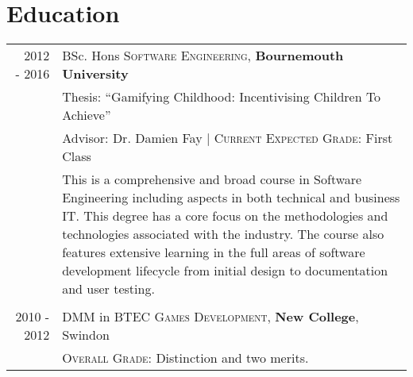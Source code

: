 \section{Education}
\begin{tabular}{r|p{11cm}}
	\ 2012 - 2016 & BSc. Hons \textsc{Software Engineering}, \textbf{Bournemouth University}\\ 
	\ & Thesis: ``Gamifying Childhood: Incentivising Children To Achieve'' \\
	\ & Advisor: Dr. Damien Fay | \normalsize \textsc{Current Expected Grade}: First Class \\
	\ & \footnotesize{This is a comprehensive and broad course in Software Engineering including aspects in both technical and business IT. This degree has a core focus on the methodologies and technologies associated with the industry. The course also features extensive learning in the full areas of software development lifecycle from initial design to documentation and user testing.} \\

	\multicolumn{2}{c}{} \\


	2010 - 2012 & DMM in BTEC \textsc{Games Development}, \textbf{New College}, Swindon\\
	\ & \textsc{Overall Grade}: Distinction and two merits.
\end{tabular}
